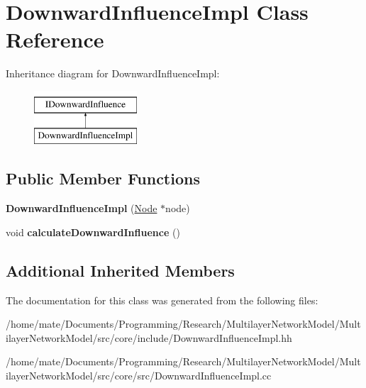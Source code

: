 \hypertarget{classDownwardInfluenceImpl}{}\section{Downward\+Influence\+Impl Class Reference}
\label{classDownwardInfluenceImpl}
Inheritance diagram for Downward\+Influence\+Impl\+:\begin{figure}[H]
\begin{center}
\leavevmode
\includegraphics[height=2.000000cm]{classDownwardInfluenceImpl}
\end{center}
\end{figure}
\subsection*{Public Member Functions}
\begin{DoxyCompactItemize}
\item 
{\bfseries Downward\+Influence\+Impl} (\hyperlink{classNode}{Node} $\ast$node)\hypertarget{classDownwardInfluenceImpl_add04549a8e99e67304c133b4d9a46fc9}{}\label{classDownwardInfluenceImpl_add04549a8e99e67304c133b4d9a46fc9}

\item 
void {\bfseries calculate\+Downward\+Influence} ()\hypertarget{classDownwardInfluenceImpl_a05fdd6c5ef32911d503d9262e9431812}{}\label{classDownwardInfluenceImpl_a05fdd6c5ef32911d503d9262e9431812}

\end{DoxyCompactItemize}
\subsection*{Additional Inherited Members}


The documentation for this class was generated from the following files\+:\begin{DoxyCompactItemize}
\item 
/home/mate/\+Documents/\+Programming/\+Research/\+Multilayer\+Network\+Model/\+Multilayer\+Network\+Model/src/core/include/Downward\+Influence\+Impl.\+hh\item 
/home/mate/\+Documents/\+Programming/\+Research/\+Multilayer\+Network\+Model/\+Multilayer\+Network\+Model/src/core/src/Downward\+Influence\+Impl.\+cc\end{DoxyCompactItemize}

